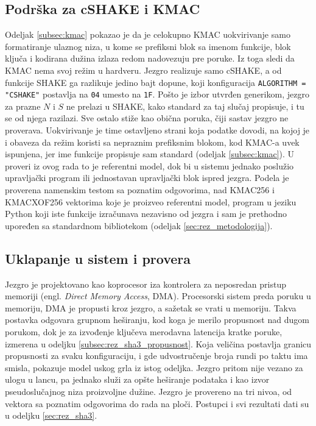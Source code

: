 \subsection{Podrška za cSHAKE i KMAC}
\label{subsec:hw_sha3_kmac}

Odeljak \ref{subsec:kmac} pokazao je da je celokupno KMAC uokvirivanje samo formatiranje ulaznog niza, u kome se prefiksni blok sa imenom funkcije, blok ključa i kodirana dužina izlaza redom nadovezuju pre poruke.
\smallbreak
Iz toga sledi da KMAC nema svoj režim u hardveru. Jezgro realizuje samo cSHAKE, a od funkcije SHAKE ga razlikuje jedino bajt dopune, koji konfiguracija \texttt{ALGORITHM = "CSHAKE"} postavlja na \texttt{04} umesto na \texttt{1F}. Pošto je izbor utvrđen generikom, jezgro za prazne $N$ i $S$ ne prelazi u SHAKE, kako standard za taj slučaj propisuje, i tu se od njega razilazi. Sve ostalo stiže kao obična poruka, čiji sastav jezgro ne proverava. Uokvirivanje je time ostavljeno strani koja podatke dovodi, na kojoj je i obaveza da režim koristi sa nepraznim prefiksnim blokom, kod KMAC-a uvek ispunjena, jer ime funkcije propisuje sam standard (odeljak \ref{subsec:kmac}). U proveri iz ovog rada to je referentni model, dok bi u sistemu jednako poslužio upravljački program ili jednostavan upravljački blok ispred jezgra.
\smallbreak
Podela je proverena namenskim testom sa poznatim odgovorima, nad KMAC256 i KMACXOF256 vektorima koje je proizveo referentni model, program u jeziku Python koji iste funkcije izračunava nezavisno od jezgra i sam je prethodno upoređen sa standardnom bibliotekom (odeljak \ref{sec:rez_metodologija}).

\subsection{Uklapanje u sistem i provera}
\label{subsec:hw_sha3_uklapanje}

Jezgro je projektovano kao koprocesor iza kontrolera za neposredan pristup memoriji (engl. \textit{Direct Memory Access}, DMA). Procesorski sistem preda poruku u memoriju, DMA je propusti kroz jezgro, a sažetak se vrati u memoriju. Takva postavka odgovara grupnom heširanju, kod koga je merilo propusnost nad dugom porukom, dok je za izvođenje ključeva merodavna latencija kratke poruke, izmerena u odeljku \ref{subsec:rez_sha3_propusnost}. Koja veličina postavlja granicu propusnosti za svaku konfiguraciju, i gde udvostručenje broja rundi po taktu ima smisla, pokazuje model uskog grla iz istog odeljka.
\smallbreak
Jezgro pritom nije vezano za ulogu u lancu, pa jednako služi za opšte heširanje podataka i kao izvor pseudoslučajnog niza proizvoljne dužine.
\smallbreak
Jezgro je provereno na tri nivoa, od vektora sa poznatim odgovorima do rada na ploči. Postupci i svi rezultati dati su u odeljku \ref{sec:rez_sha3}.

